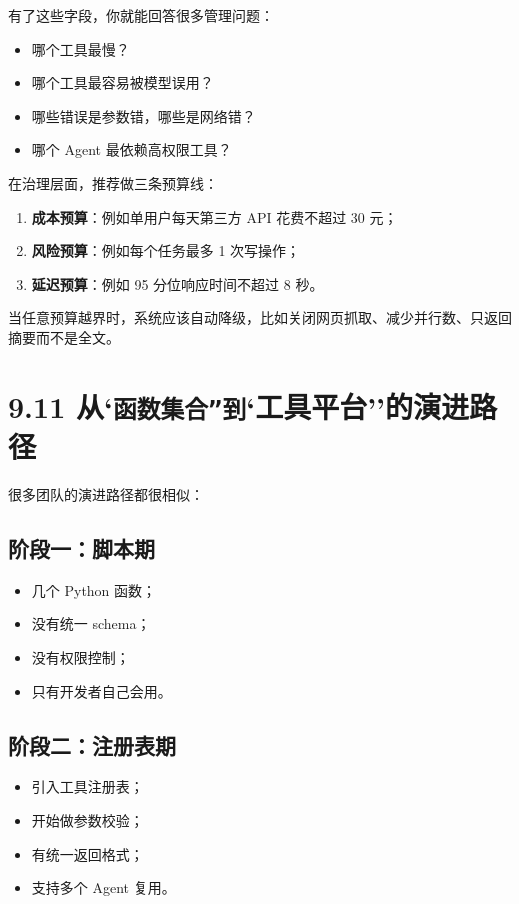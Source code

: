 有了这些字段，你就能回答很多管理问题：


\begin{itemize}[leftmargin=2em]
\item 哪个工具最慢？
\item 哪个工具最容易被模型误用？
\item 哪些错误是参数错，哪些是网络错？
\item 哪个 Agent 最依赖高权限工具？
\end{itemize}

在治理层面，推荐做三条预算线：


\begin{enumerate}[leftmargin=2em]
\item \textbf{成本预算}：例如单用户每天第三方 API 花费不超过 30 元；
\item \textbf{风险预算}：例如每个任务最多 1 次写操作；
\item \textbf{延迟预算}：例如 95 分位响应时间不超过 8 秒。
\end{enumerate}

当任意预算越界时，系统应该自动降级，比如关闭网页抓取、减少并行数、只返回摘要而不是全文。


\section{9.11 从`\texttt{函数集合''到}`工具平台''的演进路径}

很多团队的演进路径都很相似：


\subsection{阶段一：脚本期}

\begin{itemize}[leftmargin=2em]
\item 几个 Python 函数；
\item 没有统一 schema；
\item 没有权限控制；
\item 只有开发者自己会用。
\end{itemize}

\subsection{阶段二：注册表期}

\begin{itemize}[leftmargin=2em]
\item 引入工具注册表；
\item 开始做参数校验；
\item 有统一返回格式；
\item 支持多个 Agent 复用。
\end{itemize}

